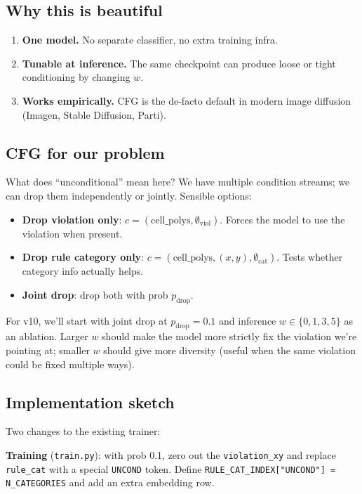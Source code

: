\documentclass[11pt,a4paper]{article}
\begin{document}
\subsection{Why this is beautiful}

\begin{enumerate}[leftmargin=*]
\item \textbf{One model.} No separate classifier, no extra training infra.
\item \textbf{Tunable at inference.} The same checkpoint can produce
  loose or tight conditioning by changing $w$.
\item \textbf{Works empirically.} CFG is the de-facto default in modern
  image diffusion (Imagen, Stable Diffusion, Parti).
\end{enumerate}

\subsection{CFG for our problem}

What does ``unconditional'' mean here? We have multiple condition
streams; we can drop them independently or jointly. Sensible options:
\begin{itemize}[leftmargin=*]
\item \textbf{Drop violation only}: $c = (\text{cell\_polys}, \emptyset_{\text{viol}})$.
  Forces the model to use the violation when present.
\item \textbf{Drop rule category only}: $c = (\text{cell\_polys}, (x,y), \emptyset_{\text{cat}})$.
  Tests whether category info actually helps.
\item \textbf{Joint drop}: drop both with prob $p_{\text{drop}}$.
\end{itemize}
For v10, we'll start with joint drop at $p_{\text{drop}} = 0.1$ and
inference $w \in \{0, 1, 3, 5\}$ as an ablation. Larger $w$ should make
the model more strictly fix the violation we're pointing at; smaller $w$
should give more diversity (useful when the same violation could be
fixed multiple ways).

\subsection{Implementation sketch}

Two changes to the existing trainer:

\textbf{Training} (\texttt{train.py}): with prob 0.1, zero out the
\verb|violation_xy| and replace \verb|rule_cat| with a special
\verb|UNCOND| token. Define
\verb|RULE_CAT_INDEX["UNCOND"] = N_CATEGORIES| and add an extra
embedding row.
\end{document}
